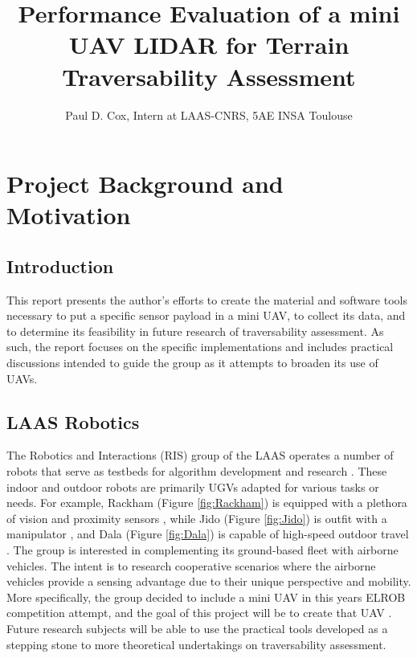 \documentclass[a4paper,11pt]{report}
\title{Performance Evaluation of a mini UAV LIDAR for Terrain Traversability Assessment}
\author{Paul D. Cox, Intern at LAAS-CNRS, 5AE INSA Toulouse}
\begin{document}
\maketitle

\tableofcontents
\newpage

\chapter{Project Background and Motivation}

\section{Introduction}

This report presents the author's efforts to create the material and software tools necessary to put a specific sensor payload in a mini UAV, to collect its data, and to determine its feasibility in future research of traversability assessment.  As such, the report focuses on the specific implementations and includes practical discussions intended to guide the group as it attempts to broaden its use of UAVs.

\section{LAAS Robotics}

The Robotics and Interactions (RIS) group of the LAAS operates a number of robots that serve as testbeds for algorithm development and research \cite{ugvs}. These indoor and outdoor robots are primarily UGVs adapted for various tasks or needs. For example, Rackham (Figure \ref{fig:Rackham}) is equipped with a plethora of vision and proximity sensors \cite{rackham}, while Jido (Figure \ref{fig:Jido}) is outfit with a manipulator \cite{jido}, and Dala (Figure \ref{fig:Dala}) is capable of high-speed outdoor travel \cite{dala}. The group is interested in complementing its ground-based fleet with airborne vehicles. The intent is to research cooperative scenarios where the airborne vehicles provide a sensing advantage due to their unique perspective and mobility. More specifically, the group decided to include a mini UAV in this years ELROB competition attempt, and the goal of this project will be to create that UAV \cite{this}. Future research subjects will be able to use the practical tools developed as a stepping stone to more theoretical undertakings on traversability assessment.
\end{document}
